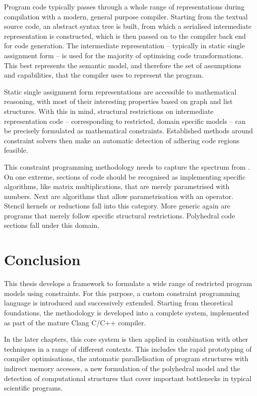     Program code typically passes through a whole range of representations
    during compilation with a modern, general purpose compiler.
    Starting from the textual source code, an abstract syntax tree is built,
    from which a serialised intermediate representation is constructed,
    which is then passed on to the compiler back end for code generation.
    The intermediate representation -- typically in static single assignment
    form -- is used for the majority of optimising code transformations.
    This best represents the semantic model, and therefore the set of
    assumptions and capabilities, that the compiler uses to represent the
    program.

    Static single assignment form representations are accessible to mathematical
    reasoning, with most of their interesting properties based on graph and list
    structures.
    With this in mind, structural restrictions on intermediate representation
    code -- corresponding to restricted, domain specific models -- can be
    precisely formulated as mathematical constraints.
    Established methods around constraint solvers then make an automatic
    detection of adhering code regions feasible.

    This constraint programming methodology needs to capture the spectrum from
    .
    On one extreme, sections of code should be recognised as implementing
    specific algorithms, like matrix multiplications, that are merely
    parametrised with numbers.
    Next are algorithms that allow parametrisation with an operator.
    Stencil kernels or reductions fall into this category.
    More generic again are programs that merely follow specific structural
    restrictions.
    Polyhedral code sections fall under this domain.

\section{Conclusion}

    This thesis develops a framework to formulate a wide range of restricted
    program models using constraints.
    For this purpose, a custom constraint programming language is introduced
    and successively extended.
    Starting from theoretical foundations, the methodology is developed into
    a complete system, implemented as part of the mature Clang C/C++ compiler.

    In the later chapters, this core system is then applied in combination
    with other techniques in a range of different contexts.
    This includes the rapid prototyping of compiler optimisations, the
    automatic parallelisation of program structures with indirect memory
    accesses, a new formulation of the polyhedral model and the detection of
    computational structures that cover important bottlenecks in typical
    scientific programs.
    
